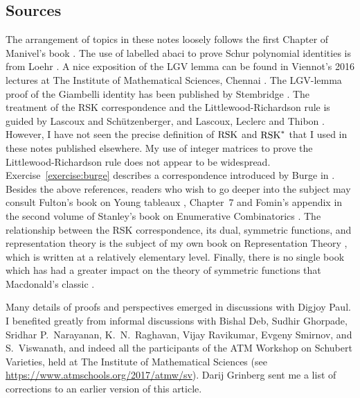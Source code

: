 \documentclass[11pt]{amsproc}
\theoremstyle{definition}
\theoremstyle{example}
\newcommand{\rsk}{\textup{RSK}}
\begin{document}
\subsection{Sources}
\label{sec:notes-literature}
The arrangement of topics in these notes loosely follows the first Chapter of Manivel's book \cite{manivel}.
The use of labelled abaci to prove Schur polynomial identities is from Loehr \cite{loehr}.
A nice exposition of the LGV lemma can be found in Viennot's 2016 lectures at The Institute of Mathematical Sciences, Chennai \cite{imsc2016}.
The LGV-lemma proof of the Giambelli identity has been published by Stembridge \cite{stembridge}.
The treatment of the RSK correspondence and the Littlewood-Richardson rule is guided by Lascoux and Sch\"utzenberger\cite{ls}, and Lascoux, Leclerc and Thibon \cite{llt}.
However, I have not seen the precise definition of $\rsk$ and $\rsk^*$ that I used in these notes published elsewhere.
My use of integer matrices to prove the Littlewood-Richardson rule does not appear to be widespread.
Exercise~\ref{exercise:burge} describes a correspondence introduced by Burge in \cite{burge}.
Besides the above references, readers who wish to go deeper into the subject may consult Fulton's book on Young tableaux \cite{fulton}, Chapter~7 and Fomin's appendix in the second volume of Stanley's book on Enumerative Combinatorics \cite{ec2}.
The relationship between the RSK correspondence, its dual, symmetric functions, and representation theory is the subject of my own book on Representation Theory \cite{rtcv}, which is written at a relatively elementary level.
Finally, there is no single book which has had a greater impact on the theory of symmetric functions that Macdonald's classic \cite{macd}.

Many details of proofs and perspectives emerged in discussions with Digjoy Paul.
I benefited greatly from informal discussions with Bishal Deb, Sudhir Ghorpade, Sridhar P.~Narayanan, K.~N.~Raghavan, Vijay Ravikumar, Evgeny Smirnov, and  S.~Viswanath, and indeed all the participants of the ATM Workshop on Schubert Varieties, held at The Institute of Mathematical Sciences (see \url{https://www.atmschools.org/2017/atmw/sv}).
Darij Grinberg sent me a list of corrections to an earlier version of this article.


\end{document}
